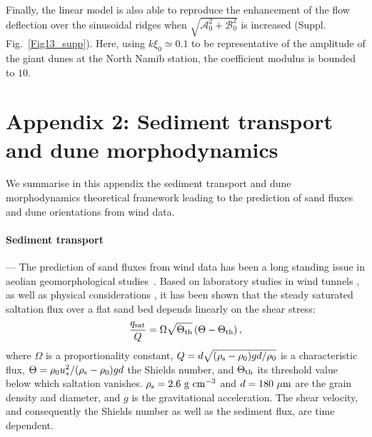 Finally, the linear model is also able to reproduce the enhancement of the flow deflection over the sinusoidal ridges when $\sqrt{\mathcal{A}_{0}^{2} + \mathcal{B}_{0}^{2}}$ is increased (Suppl. Fig.~\ref{Fig13_supp}). Here, using $k\xi_0 \simeq 0.1$ to be representative of the amplitude of the giant dunes at the North Namib station, the coefficient modulus is bounded to $10$.


\section*{Appendix 2: Sediment transport and dune morphodynamics}

We summarise in this appendix the sediment transport and dune morphodynamics theoretical framework leading to the prediction of sand fluxes and dune orientations from wind data.

\paragraph{Sediment transport} ---
The prediction of sand fluxes from wind data has been a long standing issue in aeolian geomorphological studies~\citep{Fryberger79, Pearce2005, Sherman2012, Shen2019}. Based on laboratory studies in wind tunnels \citep{Rasmussen96, Iversen99, Creyssels2009, Ho2011}, as well as physical considerations \citep{Ungar1987, Andreotti2004bis, Duran2011, Pahtz2020}, it has been shown that the steady saturated saltation flux over a flat sand bed depends linearly on the shear stress:
%
\begin{equation}
\label{transport_law_quadratic}
\frac{q_{\textup{sat}}}{Q} = \Omega\sqrt{\Theta_{\textup{th}}}\left(\Theta - \Theta_{\textup{th}}\right),
\end{equation}
%
where $\Omega$ is a proportionality constant, $Q = d\sqrt{(\rho_{\textup{s}} - \rho_{0})gd/\rho_{0}}$ is a characteristic flux, $\Theta = \rho_{0} u_{*}^{2}/(\rho_{\textup{s}} - \rho_{0})gd$ the Shields number, and $\Theta_{\textup{th}}$ its threshold value below which saltation vanishes. $\rho_{\textup{s}} = 2.6~\textup{g}~\textup{cm}^{-3}$ and $d=180~\mu\textup{m}$ are the grain density and diameter, and $g$ is the gravitational acceleration. The shear velocity, and consequently the Shields number as well as the sediment flux, are time dependent.

